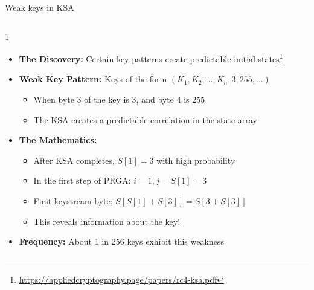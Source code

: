 \documentclass[aspectratio=169, lualatex, handout]{beamer}
\begin{document}
\begin{frame}{Weak keys in KSA}
	\begin{columns}[c]
		\begin{column}{1\textwidth}
			\begin{itemize}[<+->]
				\item \textbf{The Discovery:} Certain key patterns create predictable initial states\footnote{\url{https://appliedcryptography.page/papers/rc4-ksa.pdf}}
				\item \textbf{Weak Key Pattern:} Keys of the form $(K_1, K_2, \ldots, K_n, 3, 255, \ldots)$
				      \begin{itemize}[<+->]
					      \item When byte 3 of the key is 3, and byte 4 is 255
					      \item The KSA creates a predictable correlation in the state array
				      \end{itemize}
				\item \textbf{The Mathematics:}
				      \begin{itemize}[<+->]
					      \item After KSA completes, $S[1] = 3$ with high probability
					      \item In the first step of PRGA: $i = 1, j = S[1] = 3$
					      \item First keystream byte: $S[S[1] + S[3]] = S[3 + S[3]]$
					      \item This reveals information about the key!
				      \end{itemize}
				\item \textbf{Frequency:} About 1 in 256 keys exhibit this weakness
			\end{itemize}
		\end{column}
	\end{columns}
\end{frame}
\end{document}

